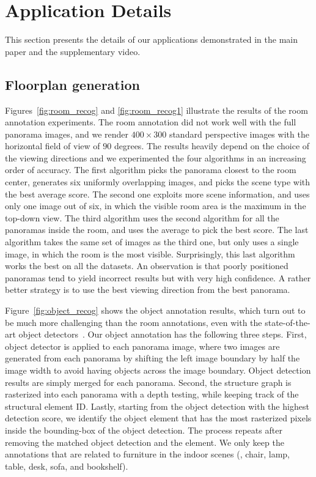 \section{Application Details}

This section presents the details of our applications demonstrated in
the main paper and the supplementary video.

\subsection{Floorplan generation}

Figures~\ref{fig:room_recog} and \ref{fig:room_recog1} illustrate the
results of the room annotation experiments. The room annotation did not
work well with the full panorama images, and we render $400\times 300$
standard perspective images with the horizontal field of view of $90$
degrees. The results heavily depend on the choice of the viewing
directions and we experimented the four algorithms in an increasing
order of accuracy. The first algorithm picks the panorama closest to the
room center, generates six uniformly overlapping images, and picks the
scene type with the best average score. The second one exploits more
scene information, and uses only one image out of six, in which the
visible room area is the maximum in the top-down view. The third
algorithm uses the second algorithm for all the panoramas inside the
room, and uses the average to pick the best score. The last algorithm
takes the same set of images as the third one, but only uses a single
image, in which the room is the most visible. Surprisingly, this last
algorithm works the best on all the datasets. An observation is that
poorly positioned panoramas tend to yield incorrect results but with
very high confidence. A rather better strategy is to use the best
viewing direction from the best panorama.


  
Figure~\ref{fig:object_recog} shows the object annotation results, which
turn out to be much more challenging than the room annotations, even
with the state-of-the-art object
detectors~\cite{berkeley_object_detection_software}. Our object
annotation has the following three steps. First, object detector is
applied to each panorama image, where two images are generated from each
panorama by shifting the left image boundary by half the image width to
avoid having objects across the image boundary. Object detection results
are simply merged for each panorama. Second, the structure graph is
rasterized into each panorama with a depth testing, while keeping track
of the structural element ID. Lastly, starting from the object detection
with the highest detection score, we identify the object element that
has the most rasterized pixels inside the bounding-box of the object
detection. The process repeats after removing the matched object
detection and the element. We only keep the annotations that are related
to furniture in the indoor scenes (\ie, chair, lamp, table, desk, sofa,
and bookshelf).

